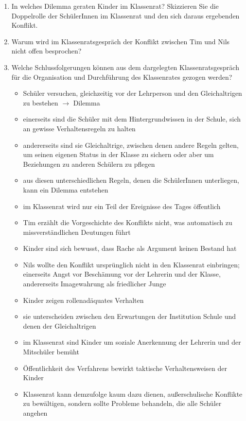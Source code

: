 \newpage


\begin{enumerate}
	\item{
		In welches Dilemma geraten Kinder im Klassenrat?
		Skizzieren Sie die Doppelrolle der SchülerInnen im Klassenrat und den sich daraus ergebenden Konflikt.
	}
	\item{Warum wird im Klassenratsgespräch der Konflikt zwischen Tim und Nils nicht \glqq offen\grqq{} besprochen?}
	\item{
		Welche Schlussfolgerungen können aus dem dargelegten Klassenratsgespräch für die Organisation und Durchführung des Klassenrates gezogen werden?
		\begin{itemize}
			\item{Schüler versuchen, gleichzeitig vor der Lehrperson und den Gleichaltrigen zu bestehen $\rightarrow$ Dilemma}
			\item{einerseits sind die Schüler mit dem Hintergrundwissen in der Schule, sich an gewisse Verhaltensregeln zu halten}
			\item{andererseits sind sie Gleichaltrige, zwischen denen andere Regeln gelten, um seinen eigenen Status in der Klasse zu sichern oder aber um Beziehungen zu anderen Schülern zu pflegen}
			\item{aus diesen unterschiedlichen Regeln, denen die SchülerInnen unterliegen, kann ein Dilemma entstehen}
			\item{im Klassenrat wird nur ein Teil der Ereignisse des Tages öffentlich}
			\item{Tim erzählt die Vorgeschichte des Konflikts nicht, was automatisch zu missverständlichen Deutungen führt}
			\item{Kinder sind sich bewusst, dass Rache als Argument keinen Bestand hat}
			\item{Nils wollte den Konflikt ursprünglich nicht in den Klassenrat einbringen; einerseits Angst vor Beschämung vor der Lehrerin und der Klasse, andererseits Imagewahrung als friedlicher Junge}
			\item{Kinder zeigen rollenadäquates Verhalten}
			\item{sie unterscheiden zwischen den Erwartungen der Institution Schule und denen der Gleichaltrigen}
			\item{im Klassenrat sind Kinder um soziale Anerkennung der Lehrerin und der Mitschüler bemüht}
			\item{Öffentlichkeit des Verfahrens bewirkt taktische Verhaltensweisen der Kinder}
			\item{Klassenrat kann demzufolge kaum dazu dienen, außerschulische Konflikte zu bewältigen, sondern sollte Probleme behandeln, die alle Schüler angehen}
		\end{itemize}
	}
\end{enumerate}

